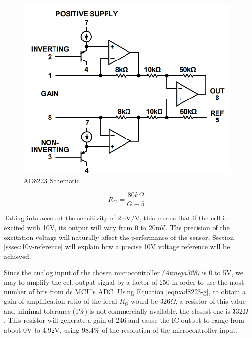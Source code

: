 		\begin{figure}[htbp]
			\centering
				\includegraphics[scale=0.65]{figuras/fig-ad8223-functional-block.png}
			\caption{AD8223 Schematic \cite{ad8223-datasheet}}
			\label{fig:ad8223-schematic}
		\end{figure}

		\begin{equation}\label{eqn:ad8223-g}
			R_{G}=\frac{80k\Omega}{G - 5}
		\end{equation}

		Taking into account the sensitivity of 2mV/V, this means that if the cell is excited with 10V, its output will vary from 0 to 20mV. The precision of the excitation voltage will naturally affect the performance of the sensor, Section \ref{sssec:10v-reference} will explain how a precise 10V voltage reference will be achieved.
		\par
		Since the analog input of the chosen microcontroller \textit{(Atmega328)} is 0 to 5V, we may to amplify the cell output signal by a factor of 250 in order to use the most number of bits from de MCU's ADC. Using Equation \ref{eqn:ad8223-g}, to obtain a gain of amplification ratio of the ideal $R_{G}$ would be 326$\Omega$, a resistor of this value and minimal tolerance (1$\%$) is not commercially available, the closest one is 332$\Omega$. This resistor will generate a gain of 246 and cause the IC output to range from about 0V to 4.92V, using 98.4\% of the resolution of the microcontroller input. 
		\par

